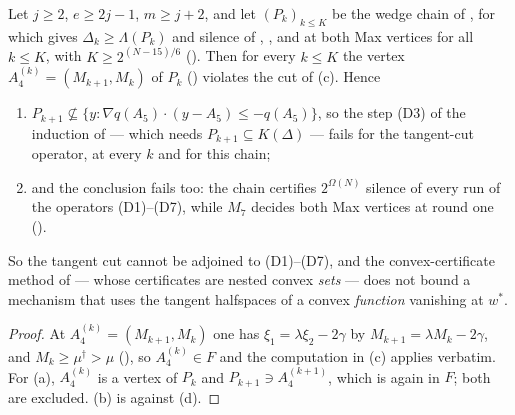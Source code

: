 \begin{corollary}\label{hz:escape}
Let $j\ge2$, $e\ge2j-1$, $m\ge j+2$, and let $(P_k)_{k\le K}$ be the wedge
chain of , for which  gives
$\Delta_k\ge\Lambda(P_k)$ and silence of ,
,  and  at both Max
vertices for all $k\le K$, with $K\ge2^{(N-15)/6}$ ().
Then for every $k\le K$ the vertex $A_4^{(k)}=(M_{k+1},M_k)$ of $P_k$
() violates the cut of (c). Hence
\begin{enumerate}[label=\textup{(\alph*)},leftmargin=2.2em]
\item $P_{k+1}\not\subseteq\{y:\nabla q(A_5)\cdot(y-A_5)\le-q(A_5)\}$, so the
      step \textup{(D3)} of the induction of  ---
      which needs $P_{k+1}\subseteq K(\Delta)$ --- fails for the tangent-cut
      operator, at every $k$ and for this chain;
\item and the conclusion fails too: the chain certifies $2^{\Omega(N)}$ silence
      of every run of the operators \textup{(D1)}--\textup{(D7)}, while $M_7$
      decides both Max vertices at round one ().
\end{enumerate}
So the tangent cut cannot be adjoined to \textup{(D1)}--\textup{(D7)}, and the
convex-certificate method of
 --- whose certificates
are nested convex \emph{sets} --- does not bound a mechanism that uses the
tangent halfspaces of a convex \emph{function} vanishing at $w^\ast$.
\end{corollary}

\begin{proof}
At $A_4^{(k)}=(M_{k+1},M_k)$ one has $\xi_1=\lambda\xi_2-2\gamma$ by
$M_{k+1}=\lambda M_k-2\gamma$, and $M_k\ge\mu^{\dagger}>\mu$
(), so $A_4^{(k)}\in F$ and the computation in
(c) applies verbatim. For (a), $A_4^{(k)}$ is a vertex of
$P_k$ and $P_{k+1}\ni A_4^{(k+1)}$, which is again in $F$; both are excluded.
(b) is  against (d).
\end{proof}

